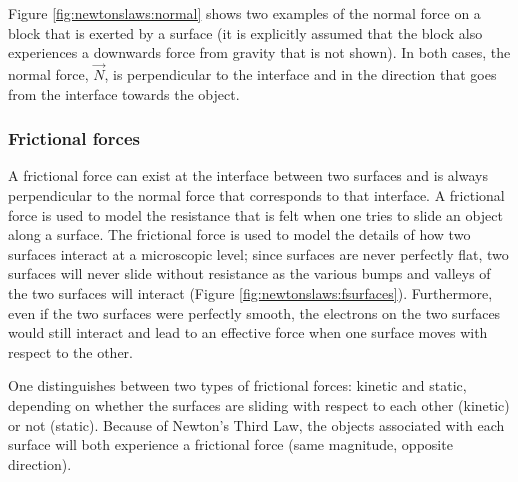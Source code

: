 Figure \ref{fig:newtonslaws:normal} shows two examples of the normal force on a block that is exerted by a surface (it is explicitly assumed that the block also experiences a downwards force from gravity that is not shown). In both cases, the normal force, $\vec N$, is perpendicular to the interface and in the direction that goes from the interface towards the object.



\subsubsection{Frictional forces}
A frictional force can exist at the interface between two surfaces and is always perpendicular to the normal force that corresponds to that interface. A frictional force is used to model the resistance that is felt when one tries to slide an object along a surface. The frictional force is used to model the details of how two surfaces interact at a microscopic level; since surfaces are never perfectly flat, two surfaces will never slide without resistance as the various bumps and valleys of the two surfaces will interact (Figure \ref{fig:newtonslaws:fsurfaces}). Furthermore, even if the two surfaces were perfectly smooth, the electrons on the two surfaces would still interact and lead to an effective force when one surface moves with respect to the other. 


One distinguishes between two types of frictional forces: kinetic and static, depending on whether the surfaces are sliding with respect to each other (kinetic) or not (static). Because of Newton's Third Law, the objects associated with each surface will both experience a frictional force (same magnitude, opposite direction).

